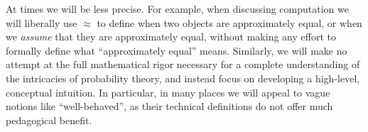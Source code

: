 At times we will be less precise.  For example, when discussing computation 
we will liberally use $\approx$ to define when two objects are approximately 
equal, or when we \emph{assume} that they are approximately equal, without 
making any effort to formally define what ``approximately equal'' means.
Similarly, we will make no attempt at the full mathematical rigor necessary for 
a complete understanding of the intricacies of probability theory, and instead 
focus on developing a high-level, conceptual intuition.  In particular, in many 
places we will appeal to vague notions like ``well-behaved'', as their technical 
definitions do not offer much pedagogical benefit.

